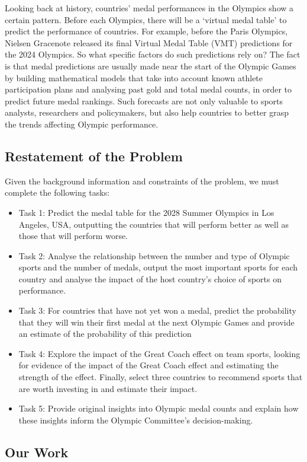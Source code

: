 \documentclass{mcmthesis}
\begin{document}
Looking back at history, countries' medal performances in the Olympics show a certain pattern. Before each Olympics, there will be a ‘virtual medal table’ to predict the performance of countries. For example, before the Paris Olympics, Nielsen Gracenote released its final Virtual Medal Table (VMT) predictions for the 2024 Olympics. So what specific factors do such predictions rely on? The fact is that medal predictions are usually made near the start of the Olympic Games by building mathematical models that take into account known athlete participation plans and analysing past gold and total medal counts, in order to predict future medal rankings. Such forecasts are not only valuable to sports analysts, researchers and policymakers, but also help countries to better grasp the trends affecting Olympic performance.

\subsection{Restatement of the Problem}%
Given the background information and constraints of the problem, we must complete the following tasks:
\begin{itemize}
\item Task 1: Predict the medal table for the 2028 Summer Olympics in Los Angeles, USA, outputting the countries that will perform better as well as those that will perform worse.
\item Task 2: Analyse the relationship between the number and type of Olympic sports and the number of medals, output the most important sports for each country and analyse the impact of the host country's choice of sports on performance.
\item Task 3: For countries that have not yet won a medal, predict the probability that they will win their first medal at the next Olympic Games and provide an estimate of the probability of this prediction
\item Task 4: Explore the impact of the Great Coach effect on team sports, looking for evidence of the impact of the Great Coach effect and estimating the strength of the effect. Finally, select three countries to recommend sports that are worth investing in and estimate their impact.
\item Task 5: Provide original insights into Olympic medal counts and explain how these insights inform the Olympic Committee's decision-making.
\end{itemize}

\subsection{Our Work}%
\end{document}
